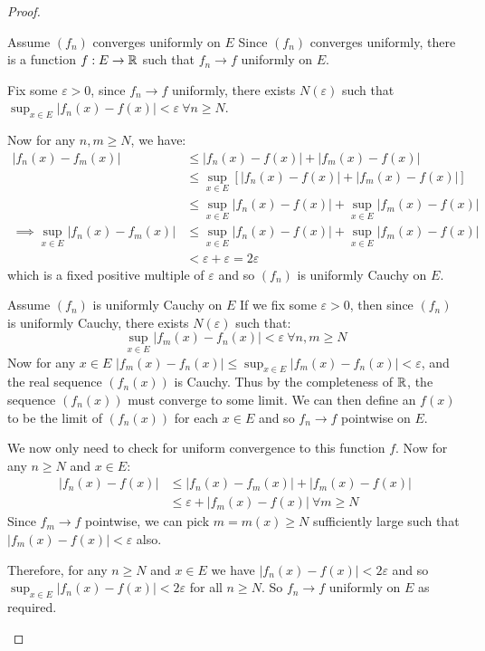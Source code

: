 \documentclass[../main.tex]{subfiles}
\begin{document}
\begin{proof}
  \begin{proofdirection}{Assume $(f_n)$ converges uniformly on $E$}
    Since $(f_n)$ converges uniformly, there is a function $f: E \to \mathbb{R}$ such that $f_n \to f$ uniformly on $E$.

    Fix some $\varepsilon > 0$, since $f_n \to f$ uniformly, there exists $N(\varepsilon)$ such that $\sup_{x \in E} |f_n(x) - f(x)| < \varepsilon\ \forall n \geq N$.

    Now for any $n, m \geq N$, we have:
    \begin{align*}
      |f_n(x) - f_m(x)| &\leq |f_n(x) - f(x)| + |f_m(x) - f(x)| \\
                        &\leq \sup_{x \in E} [|f_n(x) - f(x)| + |f_m(x) - f(x)|] \\
                        &\leq \sup_{x \in E} |f_n(x) - f(x)| + \sup_{x \in E} |f_m(x) - f(x)| \\
      \implies \sup_{x \in E} |f_n(x) - f_m(x)| &\leq \sup_{x \in E} |f_n(x) - f(x)| + \sup_{x \in E} |f_m(x) - f(x)| \\
                                                &< \varepsilon + \varepsilon = 2\varepsilon
    \end{align*}
    which is a fixed positive multiple of $\varepsilon$ and so $(f_n)$ is uniformly Cauchy on $E$.
  \end{proofdirection}
  \begin{proofdirection}{Assume $(f_n)$ is uniformly Cauchy on $E$}
    If we fix some $\varepsilon > 0$, then since $(f_n)$ is uniformly Cauchy, there exists $N(\varepsilon)$ such that:
    \[
      \sup_{x \in E} |f_m(x) - f_n(x)| < \varepsilon\ \forall n, m \geq N
    \]
    Now for any $x \in E$ $|f_m(x) - f_n(x)| \leq \sup_{x \in E} |f_m(x) - f_n(x)| < \varepsilon$, and the real sequence $(f_n(x))$ is Cauchy.
    Thus by the completeness of $\mathbb{R}$, the sequence $(f_n(x))$ must converge to some limit.
    We can then define an $f(x)$ to be the limit of $(f_n(x))$ for each $x \in E$ and so $f_n \to f$ pointwise on $E$.

    We now only need to check for uniform convergence to this function $f$.
    Now for any $n \geq N$ and $x \in E$:
    \begin{align*}
      |f_n(x) - f(x)| &\leq |f_n(x) - f_m(x)| + |f_m(x) - f(x)| \\
                      &\leq \varepsilon + |f_m(x) - f(x)|\ \forall m \geq N
    \end{align*}
    Since $f_m \to f$ pointwise, we can pick $m = m(x) \geq N$ sufficiently large such that $|f_m(x) - f(x)| < \varepsilon$ also.

    Therefore, for any $n \geq N$ and $x \in E$ we have $|f_n(x) - f(x)| < 2\varepsilon$ and so $\sup_{x \in E} |f_n(x) - f(x)| < 2 \varepsilon$ for all $n \geq N$.
    So $f_n \to f$ uniformly on $E$ as required.
  \end{proofdirection}
\end{proof}
\end{document}
